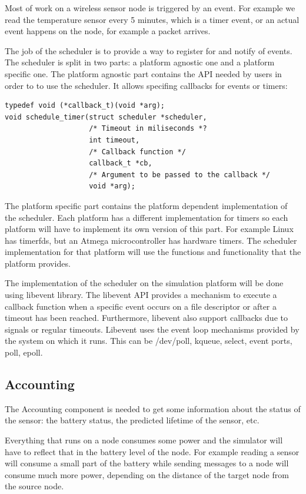 Most of work on a wireless sensor node is triggered by an event. For example
we read the temperature sensor every 5 minutes, which is a timer event, or an
actual event happens on the node, for example a packet arrives.

The job of the scheduler is to provide a way to register for and notify of
events. The scheduler is split in two parts: a platform agnostic one and a platform
specific one. The platform agnostic part contains the API needed by users in
order to to use the scheduler. It allows specifing callbacks for events or timers:

\begin{lstlisting}
typedef void (*callback_t)(void *arg);
void schedule_timer(struct scheduler *scheduler,
                    /* Timeout in miliseconds *?
                    int timeout, 
                    /* Callback function */
                    callback_t *cb, 
                    /* Argument to be passed to the callback */
                    void *arg);
\end{lstlisting}
The platform specific part contains the platform dependent implementation of
the scheduler. Each platform has a different implementation for timers so each
platform will have to implement its own version of this part. For example Linux has
timerfds, but an Atmega microcontroller has hardware timers. The scheduler
implementation for that platform will use the functions and functionality that the platform provides.

The implementation of the scheduler on the simulation platform will be done
using libevent\cite{libevent} library. The libevent API provides a mechanism to execute a callback
function when a specific event occurs on a file descriptor or after a timeout
has been reached. Furthermore, libevent also support callbacks due to signals
or regular timeouts. Libevent uses the event loop mechanisms provided by the
system on which it runs. This can be /dev/poll, kqueue, select, event ports,
poll, epoll.

\subsection{Accounting}

The Accounting component is needed to get some information about the
status of the sensor: the battery status, the predicted lifetime of the
sensor, etc. 

Everything that runs on a node consumes some power and the simulator will have
to reflect that in the battery level of the node. For example reading a sensor
will consume a small part of the battery while sending messages to a node will
consume much more power, depending on the distance of the target node from the
source node.

